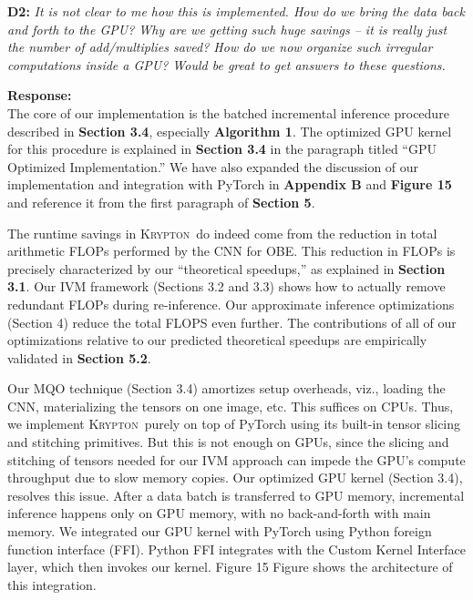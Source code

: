 \documentclass[preprint]{vldb}
\newcommand{\system}{\textsc{Krypton}}
\begin{document}
\vspace{2mm}
\noindent \textbf{D2:} \textit{It is not clear to me how this is implemented. How do we bring the data back and forth to the GPU? Why are we getting such huge savings -- it is really just the number of add/multiplies saved? How do we now organize such irregular computations inside a GPU? Would be great to get answers to these questions.}

\vspace{2mm}
\noindent \textbf{Response:}\\
The core of our implementation is the batched incremental inference procedure described in \textbf{Section 3.4}, especially \textbf{Algorithm 1}. The optimized GPU kernel for this procedure is explained in \textbf{Section 3.4} in the paragraph titled ``GPU Optimized Implementation.'' We have also expanded the discussion of our implementation and integration with PyTorch in \textbf{Appendix B} and \textbf{Figure 15} and reference it from the first paragraph of \textbf{Section 5}.

The runtime savings in \system ~do indeed come from the reduction in total arithmetic FLOPs performed by the CNN for OBE. This reduction in FLOPs is precisely characterized by our ``theoretical speedups,'' as explained in \textbf{Section 3.1}. Our IVM framework (Sections 3.2 and 3.3) shows how to actually remove redundant FLOPs during re-inference. Our approximate inference optimizations (Section 4) reduce the total FLOPS even further. The contributions of all of our optimizations relative to our predicted theoretical speedups are empirically validated in \textbf{Section 5.2}.

Our MQO technique (Section 3.4) amortizes setup overheads, viz., loading the CNN, materializing the tensors on one image, etc. This suffices on CPUs. Thus, we implement \system ~purely on top of PyTorch using its built-in tensor slicing and stitching primitives. But this is not enough on GPUs, since the slicing and stitching of tensors needed for our IVM approach can impede the GPU's compute throughput due to slow memory copies. Our optimized GPU kernel (Section 3.4), resolves this issue. After a data batch is transferred to GPU memory, incremental inference happens only on GPU memory, with no back-and-forth with main memory. We integrated our GPU kernel with PyTorch using Python foreign function interface (FFI). Python FFI integrates with the Custom Kernel Interface layer, which then invokes our kernel. Figure 15 Figure shows the architecture of this integration.
\end{document}
